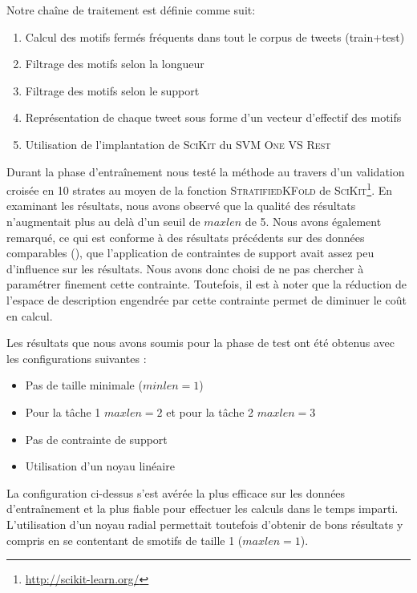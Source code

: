  Notre chaîne de traitement est définie comme suit:
\begin{enumerate}
  \item Calcul des motifs fermés fréquents dans tout le corpus de tweets (train+test)
  \item Filtrage des motifs selon la longueur
  \item Filtrage des motifs selon le support
  \item Représentation de chaque tweet sous forme d'un vecteur d'effectif des motifs
  \item Utilisation de l'implantation de \textsc{SciKit} du SVM \textsc{One VS Rest}
\end{enumerate}

 
Durant la phase d'entraînement nous testé la méthode au travers d'un validation croisée en 10 strates au moyen de la fonction \textsc{StratifiedKFold} de \textsc{SciKit}\footnote{\url{http://scikit-learn.org/}}.
 En examinant les résultats, nous avons observé que la qualité des résultats n'augmentait plus au delà d'un seuil de $maxlen$ de 5.
Nous avons également remarqué, ce qui est conforme à des résultats précédents sur des données comparables (\cite{Buscaldi-2017}), que l'application de contraintes de support avait assez peu d'influence sur les résultats.
 Nous avons donc choisi de ne pas chercher à paramétrer finement cette contrainte.
 Toutefois, il est à noter que la réduction de l'espace de description engendrée par cette contrainte permet de diminuer le coût en calcul.

 Les résultats que nous avons soumis pour la phase de test ont été obtenus avec les configurations suivantes :
\begin{itemize}
  \item Pas de taille minimale ($minlen=1$)
  \item Pour la tâche 1 $maxlen=2$ et pour la tâche 2 $maxlen=3$
  \item Pas de contrainte de support
  \item Utilisation d'un noyau linéaire
\end{itemize}

 La configuration ci-dessus s'est avérée la plus efficace sur les données d'entraînement et la plus fiable pour effectuer les calculs dans le temps imparti. L'utilisation d'un noyau radial permettait toutefois d'obtenir de bons résultats y compris en se contentant de smotifs de taille 1 ($maxlen=1$).

 

